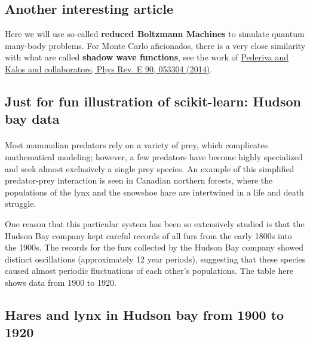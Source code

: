 \documentclass[%
oneside,                 %
final,                   %
10pt]{article}
\begin{document}
\noindent




\subsection{Another interesting article}

Here we will use so-called \textbf{reduced Boltzmann Machines} to simulate quantum many-body problems. For Monte Carlo aficionados, there is a very close similarity with what are called \textbf{shadow wave functions}, see the work of \href{{https://journals.aps.org/pre/abstract/10.1103/PhysRevE.90.053304}}{Pederiva and Kalos and collaborators, Phys Rev. E 90, 053304 (2014)}.

\subsection{Just for fun illustration of scikit-learn: Hudson bay data}

\paragraph{}
Most mammalian predators rely on a variety of prey, which complicates mathematical modeling; however, a few predators have become highly specialized and seek almost exclusively a single prey species. An example of this simplified predator-prey interaction is seen in Canadian northern forests, where the populations of the lynx and the snowshoe hare are intertwined in a life and death struggle.

One reason that this particular system has been so extensively studied is that the Hudson Bay company kept careful records of all furs from the early 1800s into the 1900s. The records for the furs collected by the Hudson Bay company showed distinct oscillations (approximately 12 year periods), suggesting that these species caused almost periodic fluctuations of each other's populations. The table here shows data from 1900 to 1920.




\subsection{Hares and lynx in Hudson bay from 1900 to 1920}



\vspace{6mm}
\end{document}
